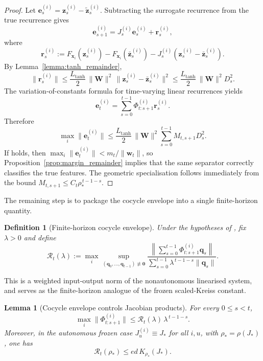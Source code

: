 \documentclass{article}
\newtheorem{lemma}[theorem]{Lemma}
\newtheorem{definition}[theorem]{Definition}
\theoremstyle{remark}
\newcommand{\bz}{\mathbf{z}}
\newcommand{\bx}{\mathbf{x}}
\newcommand{\bW}{\mathbf{W}}
\begin{document}
\begin{proof}
Let $\mathbf{e}_s^{(i)} = \bz_s^{(i)} - \tilde{\bz}_s^{(i)}$. Subtracting the
surrogate recurrence from the true recurrence gives
\[
  \mathbf{e}_{s+1}^{(i)}
  = J_s^{(i)} \mathbf{e}_s^{(i)} + \mathbf{r}_s^{(i)},
\]
where
\[
  \mathbf{r}_s^{(i)}
  := F_{\bx_i}(\bz_s^{(i)}) - F_{\bx_i}(\bar{\bz}_s^{(i)})
   - J_s^{(i)}(\bz_s^{(i)} - \bar{\bz}_s^{(i)}).
\]
By Lemma~\ref{lemma:tanh_remainder},
\[
  \|\mathbf{r}_s^{(i)}\|
  \leq \frac{L_{\tanh}}{2}\,\|\bW\|^2\,
  \|\bz_s^{(i)} - \bar{\bz}_s^{(i)}\|^2
  \leq \frac{L_{\tanh}}{2}\,\|\bW\|^2 D_s^2.
\]
The variation-of-constants formula for time-varying linear recurrences yields
\[
  \mathbf{e}_t^{(i)}
  = \sum_{s=0}^{t-1} \Phi_{t:s+1}^{(i)} \mathbf{r}_s^{(i)}.
\]
Therefore
\[
  \max_i \|\mathbf{e}_t^{(i)}\|
  \leq \frac{L_{\tanh}}{2}\,\|\bW\|^2
  \sum_{s=0}^{t-1} M_{t,s+1} D_s^2.
\]
If  holds, then
$\max_i \|\mathbf{e}_t^{(i)}\| < m_t/\|\mathbf{w}_t\|$, so
Proposition~\ref{prop:margin_remainder} implies that the same separator
correctly classifies the true features. The geometric specialisation
 follows immediately from the bound
$M_{t,s+1} \leq C_t\rho_\ast^{\,t-1-s}$.
\end{proof}

The remaining step is to package the cocycle envelope into a single
finite-horizon quantity.

\begin{definition}[Finite-horizon cocycle envelope]
\label{def:cocycle_envelope}
Under the hypotheses of , fix $\lambda > 0$ and define
\begin{equation}
  \mathcal{R}_t(\lambda)
  := \max_i \sup_{(\mathbf{q}_0,\dots,\mathbf{q}_{t-1}) \not\equiv \mathbf{0}}
  \frac{\left\|\sum_{s=0}^{t-1}\Phi_{t:s+1}^{(i)} \mathbf{q}_s\right\|}
       {\sum_{s=0}^{t-1}\lambda^{\,t-1-s}\|\mathbf{q}_s\|}.
  \label{eq:cocycle_envelope}
\end{equation}
\end{definition}

This is a weighted input-output norm of the nonautonomous linearised system,
and serves as the finite-horizon analogue of the frozen scaled-Kreiss constant.

\begin{lemma}[Cocycle envelope controls Jacobian products]
\label{lemma:cocycle_envelope}
For every $0 \leq s < t$,
\begin{equation}
  \max_i \|\Phi_{t:s+1}^{(i)}\|
  \leq \mathcal{R}_t(\lambda)\,\lambda^{\,t-1-s}.
  \label{eq:cocycle_envelope_phi}
\end{equation}
Moreover, in the autonomous frozen case $J_u^{(i)} \equiv J_\ast$ for all
$i,u$, with $\rho_\ast = \rho(J_\ast)$, one has
\begin{equation}
  \mathcal{R}_t(\rho_\ast)
  \leq e d\,K_{\rho_\ast}(J_\ast).
  \label{eq:cocycle_envelope_kreiss}
\end{equation}
\end{lemma}
\end{document}
